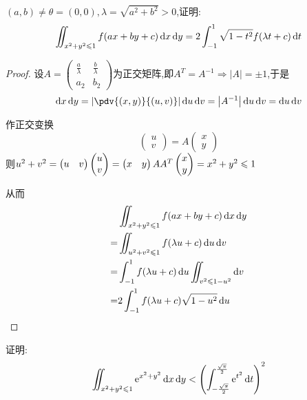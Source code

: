 \begin{example}
    $(a,b) \neq \theta = (0,0), \lambda = \sqrt{a^2+b^2} >0$,证明:
    $$\iint_{x^2 + y^2 \leqslant 1} f(ax + by + c) \operatorname{d\!} x \operatorname{d\!} y = 2 \int_{-1}^1 \sqrt{1-t^2} f(\lambda t + c) \operatorname{d\!} t$$
\end{example}

\begin{proof}
    设$A = \begin{pmatrix}
        \frac{a}{\lambda} & \frac{b}{\lambda} \\
        a_2 & b_2 
    \end{pmatrix} $为正交矩阵,即$A^T = A^{-1} \Rightarrow | A | = \pm 1$,于是
    $$\dif x \dif y = \left| \pdv{(x,y)}{(u,v)} \right| \dif u \dif v = \left| A^{-1} \right| \dif u \dif v = \dif u \dif v$$

    作正交变换$$
    \begin{pmatrix}
        u \\
        v
    \end{pmatrix} = A \begin{pmatrix}
        x \\
        y
    \end{pmatrix}
    $$
    则$u^2+v^2 = \begin{pmatrix}
        u & v
    \end{pmatrix} \begin{pmatrix}
        u \\
        v
    \end{pmatrix} = \begin{pmatrix}
        x & y
    \end{pmatrix} A A^T \begin{pmatrix}
        x \\
        y
    \end{pmatrix} = x^2 + y^2 \leqslant 1$

    从而
    \begin{align*}
        &\iint_{x^2 + y^2 \leqslant 1} f(ax + by + c) \operatorname{d\!} x \operatorname{d\!} y \\
        =& \iint_{u^2 + v^2 \leqslant 1} f(\lambda u + c) \operatorname{d\!} u \operatorname{d\!} v\\
        =& \int_{-1}^1 f(\lambda u + c) \operatorname{d\!} u \iint_{v^2 \leqslant 1 - u^2} \operatorname{d\!} v\\
        =& 2 \int_{-1}^1 f(\lambda u + c) \sqrt{1 - u^2} \operatorname{d\!} u 
    \end{align*}
\end{proof}


\begin{example}
    证明:
    $$
    \iint_{x^2 + y^2 \leqslant 1} \mathrm{e}^{x^2 + y^2} \operatorname{d\!} x \operatorname{d\!} y < \left( \int_{-\frac{\sqrt \pi}{2}}^{\frac{\sqrt \pi}{2}} \mathrm{e}^{t^2} \operatorname{d\!} t \right)^2
    $$
\end{example}

